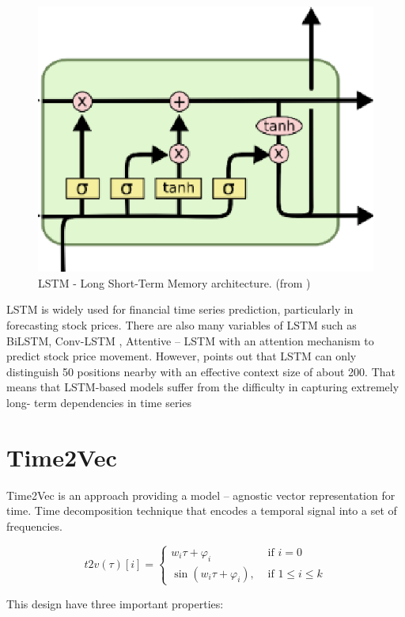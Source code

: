 \begin{figure}[H]
	\centering
	\includegraphics[width=0.6\linewidth]{images/lstm.eps}
	\caption{LSTM - Long Short-Term Memory architecture. (from \cite{pic4lstm})}
	\label{fig:lstm}
\end{figure}

LSTM \cite{6795963} is widely used for financial time series
prediction, particularly in forecasting stock prices. There are also many
variables of LSTM such as BiLSTM, Conv-LSTM \cite{Wang_2019} , Attentive – LSTM \cite{feng2019enhancing}
with an attention mechanism to predict stock price movement. However, \cite{DBLP:journals/corr/abs-1907-00235}
points out that LSTM can only distinguish 50 positions nearby with an effective context
size of about 200. That means that LSTM-based models suffer from the difficulty in
capturing extremely long- term dependencies in time series

\section{Time2Vec}

Time2Vec \cite{DBLP:journals/corr/abs-1907-05321} is an approach providing a
model – agnostic vector representation for time. Time decomposition technique that
encodes a temporal signal into a set of frequencies.

\begin{equation}
	t 2 v(\tau)[i]=\left\{
	\begin{array}{cc}
		w_i \tau+\varphi_i                    & \text{ if } i=0             \\
		\sin \left(w_i \tau+\varphi_i\right), & \text{ if } 1 \leq i \leq k
	\end{array}\right. \label{t2v}
\end{equation}
\smallskip

This design have three important properties:

